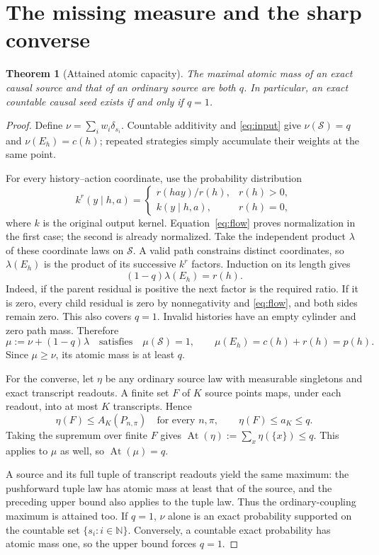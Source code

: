 \documentclass[11pt]{article}
\newtheorem{theorem}{Theorem}
\newcommand{\At}{\operatorname{At}}
\newcommand{\cS}{\mathcal S}
\begin{document}
\section{The missing measure and the sharp converse}
\begin{theorem}[Attained atomic capacity]\label{th:atomic}
The maximal atomic mass of an exact causal source and that of an ordinary
source are both $q$. In particular, an exact countable causal seed exists
if and only if $q=1$.
\end{theorem}
\begin{proof}
Define $\nu=\sum_iw_i\delta_{s_i}$. Countable additivity and
\eqref{eq:input} give $\nu(\cS)=q$ and $\nu(E_h)=c(h)$; repeated strategies
simply accumulate their weights at the same point.

For every history--action coordinate, use the probability distribution
\[
 k^r(y\mid h,a)=
 \begin{cases}
 r(hay)/r(h),&r(h)>0,\\
 k(y\mid h,a),&r(h)=0,
 \end{cases}
\]
where $k$ is the original output kernel. Equation~\eqref{eq:flow} proves
normalization in the first case; the second is already normalized. Take
the independent product $\lambda$ of these coordinate laws on $\cS$.
A valid path constrains distinct coordinates, so $\lambda(E_h)$ is the
product of its successive $k^r$ factors. Induction on its length gives
\begin{equation}\label{eq:tel}
 (1-q)\lambda(E_h)=r(h).
\end{equation}
Indeed, if the parent residual is positive the next factor is the required
ratio. If it is zero, every child residual is zero by nonnegativity and
\eqref{eq:flow}, and both sides remain zero. This also covers $q=1$.
Invalid histories have an empty cylinder and zero path mass. Therefore
\[
 \mu:=\nu+(1-q)\lambda
 \quad\text{satisfies}\quad
 \mu(\cS)=1,\qquad \mu(E_h)=c(h)+r(h)=p(h).
\]
Since $\mu\ge\nu$, its atomic mass is at least $q$.

For the converse, let $\eta$ be any ordinary source law with measurable
singletons and exact transcript readouts. A finite set $F$ of $K$ source
points maps, under each readout, into at most $K$ transcripts. Hence
\[
 \eta(F)\le A_K(P_{n,\pi})\quad\text{for every }n,\pi,
 \qquad \eta(F)\le a_K\le q.
\]
Taking the supremum over finite $F$ gives
$\At(\eta):=\sum_x\eta(\{x\})\le q$. This applies to $\mu$ as well,
so $\At(\mu)=q$.

A source and its full tuple of transcript readouts yield the same maximum:
the pushforward tuple law has atomic mass at least that of the source,
and the preceding upper bound also applies to the tuple law. Thus the
ordinary-coupling maximum is attained too. If $q=1$, $\nu$ alone is an
exact probability supported on the countable set $\{s_i:i\in\mathbb N\}$.
Conversely, a countable exact probability has atomic mass one, so the upper
bound forces $q=1$.
\end{proof}
\end{document}
